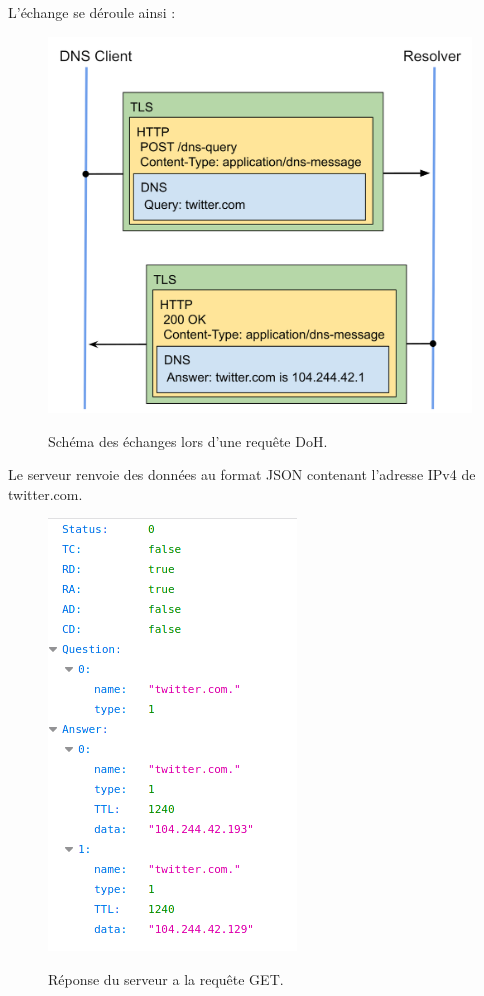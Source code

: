 \documentclass[a4paper,12pt]{article}
\begin{document}
	L'échange se déroule ainsi :
	\begin{figure}[H]
		\begin{center}
			{\includegraphics[scale=0.2]{Images/tls-example.png}}
		\end{center}
		\caption{Schéma des échanges lors d'une requête DoH.}
	\end{figure}
	
	Le serveur renvoie des données au format JSON contenant l'adresse IPv4 de twitter.com.
	
	\begin{figure}[H]
		\begin{center}
			{\includegraphics[scale=0.6]{Images/out_json.png}}
		\end{center}
		\caption{Réponse du serveur a la requête GET.}
	\end{figure}
	
\end{document}
